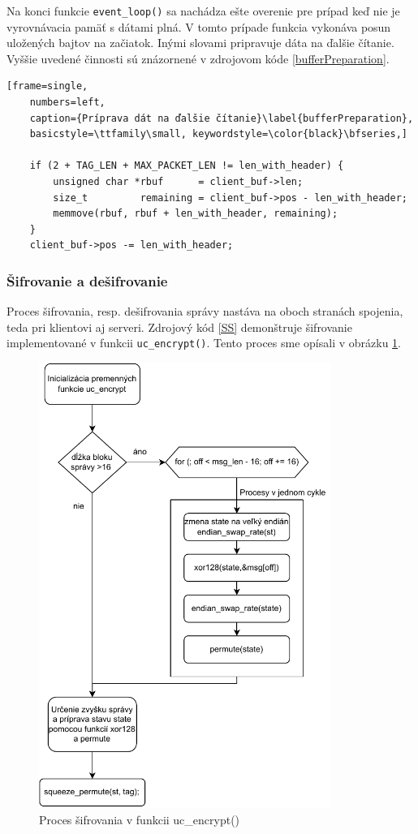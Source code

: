 Na konci funkcie \lstinline|event_loop()| sa nachádza ešte overenie pre prípad keď nie je vyrovnávacia pamäť s dátami plná. V tomto prípade funkcia vykonáva posun uložených bajtov na začiatok. Inými slovami pripravuje dáta na ďalšie čítanie. Vyššie uvedené činnosti sú znázornené v zdrojovom kóde \ref{bufferPreparation}.

\begin{lstlisting}[frame=single,
	numbers=left,
	caption={Príprava dát na ďalšie čítanie}\label{bufferPreparation},
	basicstyle=\ttfamily\small, keywordstyle=\color{black}\bfseries,]
	
	if (2 + TAG_LEN + MAX_PACKET_LEN != len_with_header) { 
		unsigned char *rbuf      = client_buf->len;
		size_t         remaining = client_buf->pos - len_with_header;
		memmove(rbuf, rbuf + len_with_header, remaining);
	}
	client_buf->pos -= len_with_header;
\end{lstlisting}
 
\subsubsection{Šifrovanie a dešifrovanie}
Proces šifrovania, resp. dešifrovania správy nastáva na oboch stranách spojenia, teda pri klientovi aj serveri. Zdrojový kód \ref{SS} demonštruje šifrovanie implementované v funkcii \lstinline|uc_encrypt()|. Tento proces sme opísali v obrázku \ref{fc3}. 

\begin{figure}
	\centering
	\includegraphics[width=0.85\textwidth]{figures/fc3}
	\caption{Proces šifrovania v funkcii uc\_encrypt()}
	\label{fc3}
\end{figure}

